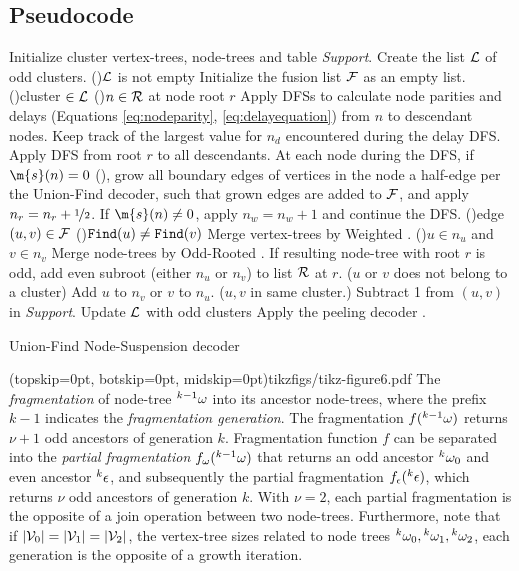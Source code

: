 \subsection{Pseudocode}\label{sec:pseudocode}
\begin{algorithm}[htb]
  \BlankLine
  \BlankLine
  Initialize cluster vertex-trees, node-trees and table \emph{Support}.\;\label{algo:B1a}
  Create the list $\mathcal{L}$ of odd clusters.\;
  \While(){$\mathcal{L}$ is not empty}{
    Initialize the fusion list $\mathcal{F}$ as an empty list.\;\label{algo:B1b}
    \For(){cluster $\in\mathcal{L}$ \label{algo:B2a}}{
      \For(){$n \in\mathcal{R}$ at node root $r$}{
        Apply DFSs to calculate node parities and delays (Equations \eqref{eq:nodeparity}, \eqref{eq:delayequation}) from $n$ to descendant nodes. Keep track of the largest value for $n_d$ encountered during the delay DFS.\;\label{algo:pdc}
      }
      Apply DFS from root $r$ to all descendants. At each node during the DFS, if $\m{s}(n)=0$ (), grow all boundary edges of vertices in the node a half-edge per the Union-Find decoder, such that grown edges are added to $\mathcal{F}$, and apply $n_r=n_r+\nicefrac{1}{2}$. If $\m{s}(n)\neq0$, apply $n_w=n_w+1$ and continue the DFS.\;\label{algo:grow}
    }
    \For(){edge $(u,v) \in \mathcal{F}$\label{algo:B3a}}{
      \eIf(){$\texttt{Find}(u)\neq\texttt{Find}(v)$}{
        Merge vertex-trees by Weighted .\;
        \eIf(){$u \in n_u$ and $v \in n_v$\label{algo:joina}}{
          Merge node-trees by Odd-Rooted . If resulting node-tree with root $r$ is odd, add even subroot (either $n_u$ or $n_v$) to list $\mathcal{R}$ at $r$.\;
        }($u$ or $v$ does not belong to a cluster){
          Add $u$ to $n_v$ or $v$ to $n_u$.\;\label{algo:joinb}
        }
      }($u,v$ in same cluster.\label{algo:dfa}){
        Subtract 1 from $(u,v)$ in \emph{Support}.\;\label{algo:dfb}
      }
    }
    Update $\mathcal{L}$ with odd clusters\; \label{algo:B3b}
  }
  Apply the peeling decoder \cite{delfosse2017linear}.\label{algo:B4a}
  \caption{Union-Find Node-Suspension decoder}\label{algo:ufbb}
\end{algorithm}

\Figure[hbt](topskip=0pt, botskip=0pt, midskip=0pt){tikzfigs/tikz-figure6.pdf}{
  The \emph{fragmentation} of node-tree ${}^{k-1}\omega$ into its ancestor node-trees, where the prefix $k-1$ indicates the \emph{fragmentation generation}. The fragmentation $f({}^{k-1}\omega)$ returns $\nu+1$ odd ancestors of generation $k$. Fragmentation function $f$ can be separated into the \emph{partial fragmentation} $f_\omega({}^{k-1}\omega)$ that returns an odd ancestor ${}^{k}\omega_0$ and even ancestor ${}^{k}\epsilon$, and subsequently the partial fragmentation $f_\epsilon({}^{k}\epsilon)$, which returns $\nu$ odd ancestors of generation $k$. With $\nu=2$, each partial fragmentation is the opposite of a join operation between two node-trees. Furthermore, note that if $\lvert\mathcal{V}_0\rvert = \lvert\mathcal{V}_1\rvert = \lvert\mathcal{V}_2\rvert$, the vertex-tree sizes related to node trees ${}^{k}\omega_0, {}^{k}\omega_1, {}^{k}\omega_2$, each generation is the opposite of a growth iteration. \label{fig6}}

